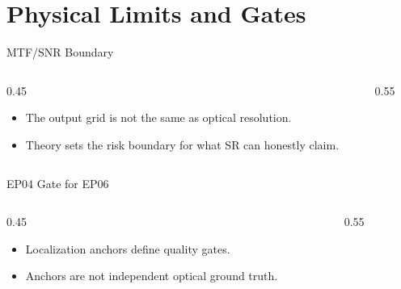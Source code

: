\section{Physical Limits and Gates}

\begin{frame}{MTF/SNR Boundary}
  \begin{columns}[c]
    \begin{column}{0.45\textwidth}
      \begin{itemize}
        \item The output grid is not the same as optical resolution.
        \item Theory sets the risk boundary for what SR can honestly claim.
      \end{itemize}
    \end{column}
    \begin{column}{0.55\textwidth}
      \centering
    \end{column}
  \end{columns}
\end{frame}

\begin{frame}{EP04 Gate for EP06}
  \begin{columns}[c]
    \begin{column}{0.45\textwidth}
      \begin{itemize}
        \item Localization anchors define quality gates.
        \item Anchors are not independent optical ground truth.
      \end{itemize}
    \end{column}
    \begin{column}{0.55\textwidth}
      \centering
    \end{column}
  \end{columns}
\end{frame}
